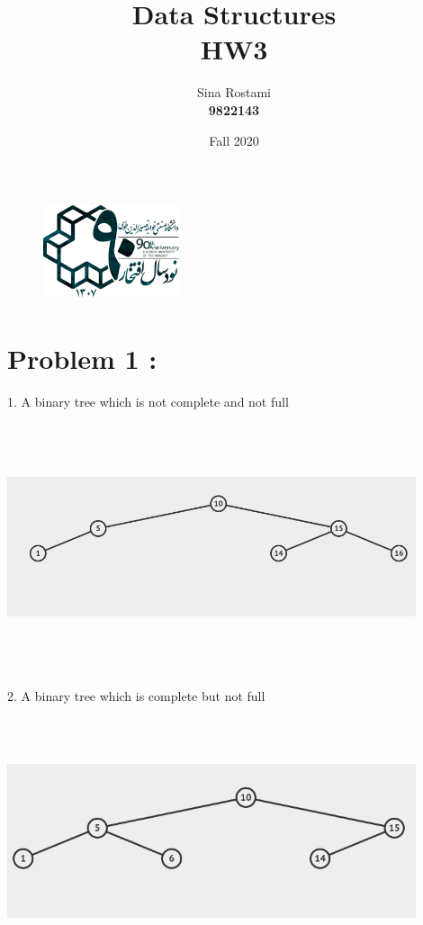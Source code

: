 \documentclass{report}
\title{\Huge Data Structures \\ HW3}
\author{\huge Sina Rostami \\\huge \textbf{9822143}}
\date{Fall 2020}
\begin{document}
    \begin{figure}
        \includegraphics[height = 30mm,width = 40mm]{../kntu_logo.jpg}
    \end{figure}
    \maketitle
    \section* {Problem 1 :}
    1. A binary tree which is not complete and not full \\
        \includegraphics[height = 80mm,width = 120mm]{1_1.png}\\
    2. A binary tree which is complete but not full\\
        \includegraphics[height = 80mm,width = 120mm]{1_2.png}\\
\end{document}
